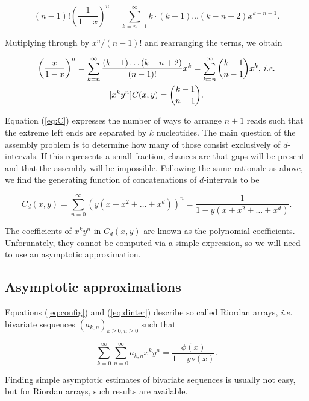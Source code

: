 \documentclass{article}
\begin{document}
\begin{equation*}
(n-1)! \left( \frac{1}{1-x} \right)^n =
\sum_{k=n-1}^\infty k \cdot (k-1) \ldots (k-n+2) x^{k-n+1}.
\end{equation*}

Mutiplying through by $x^n/(n-1)!$ and rearranging the terms, we obtain

\begin{gather}
\notag
\left( \frac{x}{1-x} \right)^n =
\sum_{k=n}^\infty \frac{(k-1) \ldots (k-n+2)}{(n-1)!} x^k
= \sum_{k=n}^\infty {k-1 \choose n-1} x^k \text{, \textit{i.e.}} \\
\label{eq:C}
[x^ky^n]C(x,y) = {k-1 \choose n-1}.
\end{gather}

Equation (\ref{eq:C}) expresses the number of ways to arrange $n+1$ reads
such that the extreme left ends are separated by $k$ nucleotides. The main
question of the assembly problem is to determine how many of those consist
exclusively of $d$-intervals. If this represents a small fraction, chances
are that gaps will be present and that the assembly will be impossible.
Following the same rationale as above, we find the generating function of
concatenations of $d$-intervals to be

\begin{equation}
\label{eq:dinter}
C_d(x,y) = \sum_{n=0}^\infty \left(y(x+x^2+\ldots+x^d)\right)^n =
\frac{1}{1-y(x+x^2+\ldots+x^d)}.
\end{equation}

The coefficients of $x^ky^n$ in $C_d(x,y)$ are known as the polynomial
coefficients. Unforunately, they cannot be computed via a simple
expression, so we will need to use an asymptotic approximation.

\subsection{Asymptotic approximations}

Equations (\ref{eq:config}) and (\ref{eq:dinter}) describe so called
Riordan arrays, \textit{i.e.} bivariate sequences $(a_{k,n})_{k \geq 0,
n \geq 0}$ such that

\begin{equation*}
\sum_{k=0}^\infty \sum_{n=0}^\infty a_{k,n} x^k y^n =
\frac{\phi(x)}{1-y \nu(x)}.
\end{equation*}

Finding simple asymptotic estimates of bivariate sequences is usually not
easy, but for Riordan arrays, such results are available.
\end{document}
